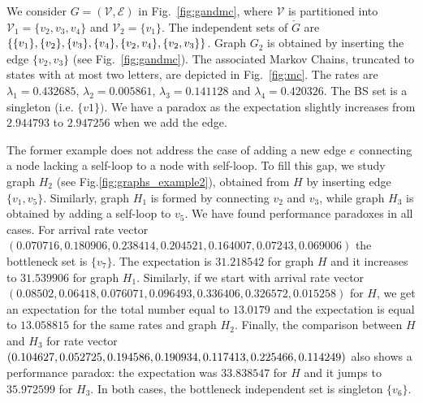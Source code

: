 \documentclass[11pt]{article}
\begin{document}
We consider $G=(\mathcal{V},\mathcal{E})$ in Fig.~\ref{fig:gandmc}, where $\mathcal{V}$ is partitioned into $\mathcal{V}_1=\{v_2, v_3, v_4\}$ and $\mathcal{V}_2=\{v_1\}$. The independent sets of $\check{G}$ are 
$
\{\{v_1\}, \{v_2\}, \{v_3\}, \{v_4\}, \{v_2,v_4\}, \\
\{v_2,v_3\}\}
$.
Graph $G_2$ is 
obtained by inserting the edge $\{v_2,v_3\}$ (see Fig.~\ref{fig:gandmc}). The associated Markov Chains, 
truncated to states with at most two letters, are depicted in Fig.~\ref{fig:mc}. 
The rates are 
$\lambda_1 = 0.432685$, 
$\lambda_2 = 0.005861$, $\lambda_3 = 0.141128$ and 
$\lambda_4 = 0.420326$. The BS set is a singleton (i.e. $\{v1\})$. 
We have a paradox as the expectation slightly increases from 
$2.944793$ to $2.947256$ when we add the edge. 



The former example does not address the case of adding a new edge $e$ connecting a node lacking a self-loop to a node with self-loop. To fill this gap, we study graph $H_2$ (see Fig.\ref{fig:graphs_example2}),  obtained from $H$ by inserting edge $\{v_1,v_5\}$. Similarly, graph $H_1$ is formed by connecting $v_2$ and $v_3$, while graph $H_3$ is obtained by adding a self-loop to {$v_5$}. We have found performance paradoxes in all cases.
For arrival rate vector 
$( 0.070716, 0.180906, 0.238414, 0.204521,  0.164007, 0.07243, 
0.069006)$
the bottleneck set is $\{v_7\}$. The expectation is $31.218542$ for graph $H$ 
and it increases to 
$ 31.539906$ for graph $H_1$.  
Similarly, if we start with arrival rate vector 
$( 0.08502,  0.06418,  0.076071,  0.096493,  0.336406, 0.326572, 0.015258)$
for $H$, we get an expectation for the total number equal to $13.0179$ and the expectation is equal to $13.058815$ for the same rates and graph $H_2$. Finally, 
the comparison between $H$ and $H_3$ for rate vector $(0.104627, 0.052725,  0.194586, 0.190934, 0.117413, 0.225466,\\ 0.114249)$ also shows a performance
paradox: the expectation was $33.838547$ for $H$ and it jumps to $35.972599$ for $H_3$. In both cases, the bottleneck independent  set is singleton $\{v_6 \}$. 
\end{document}
